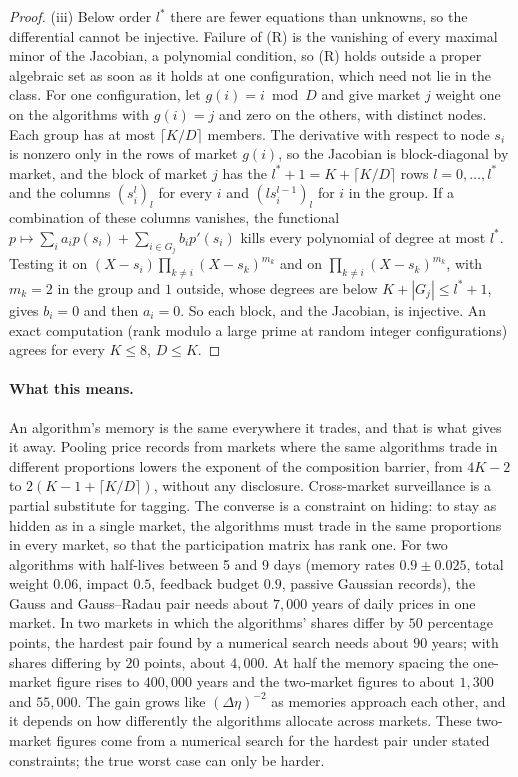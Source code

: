 \documentclass[12pt]{article}
\theoremstyle{definition}
\theoremstyle{remark}
\begin{document}
\begin{proof}
(iii) Below order $l^*$ there are fewer equations than unknowns, so the differential cannot be injective. Failure of (R) is the vanishing of every maximal minor of the Jacobian, a polynomial condition, so (R) holds outside a proper algebraic set as soon as it holds at one configuration, which need not lie in the class. For one configuration, let $g(i)=i\bmod D$ and give market $j$ weight one on the algorithms with $g(i)=j$ and zero on the others, with distinct nodes. Each group has at most $\lceil K/D\rceil$ members. The derivative with respect to node $s_i$ is nonzero only in the rows of market $g(i)$, so the Jacobian is block-diagonal by market, and the block of market $j$ has the $l^*+1=K+\lceil K/D\rceil$ rows $l=0,\ldots,l^*$ and the columns $(s_i^l)_l$ for every $i$ and $(l s_i^{l-1})_l$ for $i$ in the group. If a combination of these columns vanishes, the functional $p\mapsto\sum_ia_ip(s_i)+\sum_{i\in G_j}b_ip'(s_i)$ kills every polynomial of degree at most $l^*$. Testing it on $(X-s_i)\prod_{k\ne i}(X-s_k)^{m_k}$ and on $\prod_{k\ne i}(X-s_k)^{m_k}$, with $m_k=2$ in the group and $1$ outside, whose degrees are below $K+|G_j|\le l^*+1$, gives $b_i=0$ and then $a_i=0$. So each block, and the Jacobian, is injective. An exact computation (rank modulo a large prime at random integer configurations) agrees for every $K\le8$, $D\le K$.
\end{proof}

\paragraph{What this means.} An algorithm's memory is the same everywhere it trades, and that is what gives it away. Pooling price records from markets where the same algorithms trade in different proportions lowers the exponent of the composition barrier, from $4K-2$ to $2(K-1+\lceil K/D\rceil)$, without any disclosure. Cross-market surveillance is a partial substitute for tagging. The converse is a constraint on hiding: to stay as hidden as in a single market, the algorithms must trade in the same proportions in every market, so that the participation matrix has rank one. For two algorithms with half-lives between 5 and 9 days (memory rates $0.9\pm0.025$, total weight $0.06$, impact $0.5$, feedback budget $0.9$, passive Gaussian records), the Gauss and Gauss--Radau pair needs about $7{,}000$ years of daily prices in one market. In two markets in which the algorithms' shares differ by $50$ percentage points, the hardest pair found by a numerical search needs about $90$ years; with shares differing by $20$ points, about $4{,}000$. At half the memory spacing the one-market figure rises to $400{,}000$ years and the two-market figures to about $1{,}300$ and $55{,}000$. The gain grows like $(\Delta\eta)^{-2}$ as memories approach each other, and it depends on how differently the algorithms allocate across markets. These two-market figures come from a numerical search for the hardest pair under stated constraints; the true worst case can only be harder.
\end{document}
